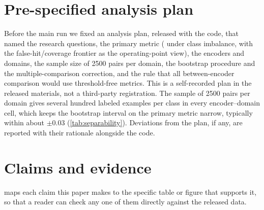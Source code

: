 \section{Pre-specified analysis plan}
\label{app:prereg}

Before the main run we fixed an analysis plan, released with the code, that named the research
questions, the primary metric (\prauc{} under class imbalance, with the false-hit/coverage
frontier as the operating-point view), the encoders and domains, the sample size of
\mbox{2500} pairs per domain, the bootstrap procedure and the multiple-comparison correction,
and the rule that all between-encoder comparison would use threshold-free metrics. This is a
self-recorded plan in the released materials, not a third-party registration. The sample of
\mbox{2500} pairs per domain gives several hundred labeled examples per class in every
encoder--domain cell, which keeps the bootstrap interval on the primary metric narrow,
typically within about $\pm 0.03$ \prauc{} (\cref{tab:separability}). Deviations from the plan,
if any, are reported with their rationale alongside the code.

\section{Claims and evidence}
\label{app:claims}

 maps each claim this paper makes to the specific table or figure that
supports it, so that a reader can check any one of them directly against the released data.

